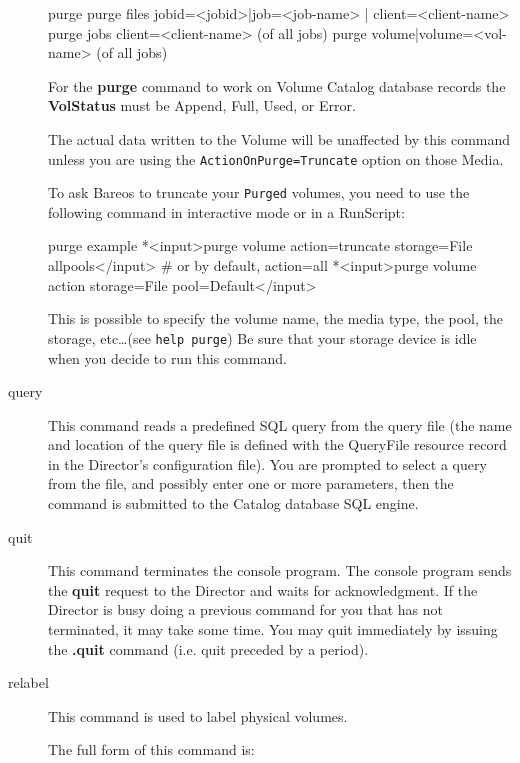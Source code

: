 \begin{description}
\begin{bconsole}{purge}
purge files jobid=<jobid>|job=<job-name> | client=<client-name>
purge jobs client=<client-name> (of all jobs)
purge volume|volume=<vol-name> (of all jobs)
\end{bconsole}

For the {\bf purge} command to work on Volume Catalog database  records the
{\bf VolStatus}  must be Append, Full, Used, or Error.

The actual data written to the Volume will be unaffected by this command unless
you are using the \texttt{ActionOnPurge=Truncate} option on those Media.

To ask Bareos to truncate your \texttt{Purged} volumes, you need to use the
following command in interactive mode or in a RunScript:
\begin{bconsole}{purge example}
*<input>purge volume action=truncate storage=File allpools</input>
# or by default, action=all
*<input>purge volume action storage=File pool=Default</input>
\end{bconsole}

This is possible to specify the volume name, the media type, the pool, the
storage, etc\dots (see \texttt{help purge}) Be sure that your storage device is
idle when you decide to run this command.

\item [query]
   This command reads a predefined SQL query from  the query file (the name and
   location of the  query file is defined with the QueryFile resource record in
   the Director's configuration file). You are prompted to select  a query from
   the file, and possibly enter one or more parameters,  then the command is
   submitted to the Catalog database SQL engine.

\item [quit]
   This command terminates the console program. The  console program sends the
   {\bf quit} request to the Director  and waits for acknowledgment. If the
   Director is busy doing  a previous command for you that has not terminated, it
   may  take some time. You may quit immediately by issuing the  {\bf .quit}
   command (i.e. quit preceded by a period).

\item [relabel]
   This command is used to label physical volumes.

   The full form of this command is:


\end{description}
